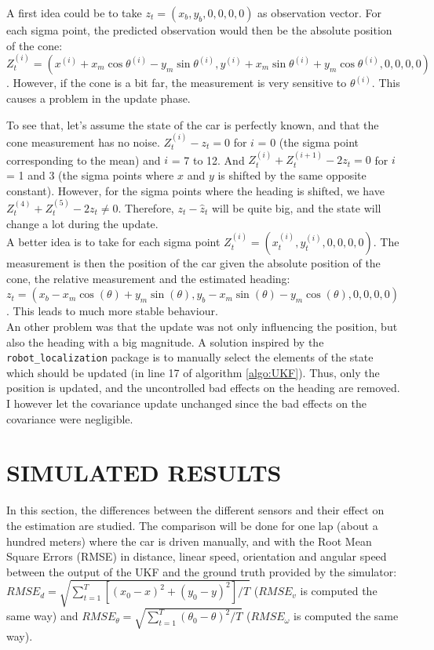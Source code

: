 \documentclass[10pt,a4paper, twocolumn]{article}
\begin{document}
A first idea could be to take $z_t = (x_b, y_b, 0, 0, 0, 0)$ as observation vector. For each sigma point, the predicted observation would then be the absolute position of the cone: $Z_t^{(i)} = (x^{(i)} + x_m\cos\theta^{(i)} - y_m\sin\theta^{(i)}, y^{(i)} + x_m\sin\theta^{(i)} + y_m\cos\theta^{(i)}, 0, 0, 0, 0) $. However, if the cone is a bit far, the measurement is very sensitive to $\theta^{(i)}$. This causes a problem in the update phase.

To see that, let's assume the state of the car is perfectly known, and that the cone measurement has no noise. $Z_t^{(i)}-z_t = 0$ for $i$ = 0 (the sigma point corresponding to the mean) and $i$ = 7 to 12. And $Z_t^{(i)} + Z_t^{(i+1)} - 2z_t = 0$ for $i$ = 1 and 3 (the sigma points where $x$ and $y$ is shifted by the same opposite constant). However, for the sigma points where the heading is shifted, we have $Z_t^{(4)} + Z_t^{(5)} - 2z_t \neq 0$. Therefore, $z_t - \hat z_t$ will be quite big, and the state will change a lot during the update. \\

A better idea is to take for each sigma point $Z_t^{(i)} = (x_t^{(i)}, y_t^{(i)}, 0, 0, 0, 0)$. The measurement is then the position of the car given the absolute position of the cone, the relative measurement and the estimated heading: $z_t = (x_b - x_m\cos(\theta) + y_m\sin(\theta), y_b - x_m\sin(\theta) - y_m\cos(\theta), 0, 0, 0, 0)$. This leads to much more stable behaviour. \\

An other problem was that the update was not only influencing the position, but also the heading with a big magnitude. A solution inspired by the \texttt{robot\_localization} package is to manually select the elements of the state which should be updated (in line 17 of algorithm \ref{algo:UKF}). Thus, only the position is updated, and the uncontrolled bad effects on the heading are removed. I however let the covariance update unchanged since the bad effects on the covariance were negligible.


\section{SIMULATED RESULTS}
In this section, the differences between the different sensors and their effect on the estimation are studied. The comparison will be done for one lap (about a hundred meters) where the car is driven manually, and with the Root Mean Square Errors (RMSE) in distance, linear speed, orientation and angular speed between the output of the UKF and the ground truth provided by the simulator: $RMSE_d = \sqrt{\sum_{t=1}^T [(x_0-x)^2 + (y_0-y)^2]/T}$ ($RMSE_v$ is computed the same way) and $RMSE_\theta = \sqrt{\sum_{t=1}^T (\theta_0-\theta)^2/T}$ ($RMSE_\omega$ is computed the same way).
\end{document}
